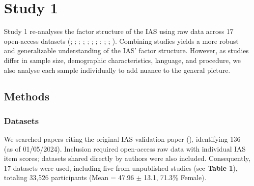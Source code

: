 \documentclass[
  jou,
  floatsintext,
  longtable,
  nolmodern,
  notxfonts,
  notimes,
  colorlinks=true,linkcolor=blue,citecolor=blue,urlcolor=blue]{apa7}
\begin{document}
\section{Study 1}\label{study-1}

Study 1 re-analyses the factor structure of the IAS using raw data
across 17 open-access datasets (; ;
;
;
;
;
;
;
;
; ). Combining studies yields a more robust and
generalizable understanding of the IAS' factor structure. However, as
studies differ in sample size, demographic characteristics, language,
and procedure, we also analyse each sample individually to add nuance to
the general picture.

\subsection{Methods}\label{methods}

\subsubsection{Datasets}\label{datasets}

We searched papers citing the original IAS validation paper
(), identifying 136 (as of
01/05/2024). Inclusion required open-access raw data with individual IAS
item scores; datasets shared directly by authors were also included.
Consequently, 17 datasets were used, including five from unpublished
studies (see \textbf{Table 1}), totaling 33,526 participants (Mean =
47.96 \(\pm\) 13.1, 71.3\% Female).
\end{document}
